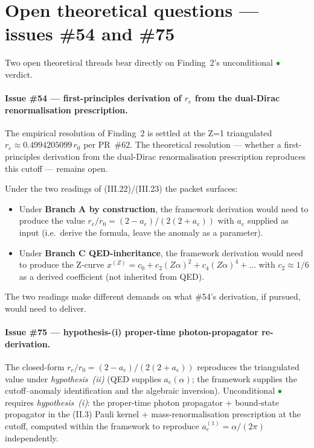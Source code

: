 \section{Open theoretical questions --- issues \#54 and \#75}
\label{sec:open-theoretical-question}

Two open theoretical threads bear directly on Finding~2's unconditional
$\mathbin{\hbox{\color{green!60!black}\(\bullet\)}}$ verdict.

\paragraph{Issue \#54 --- first-principles derivation of $r_e$ from the
dual-Dirac renormalisation prescription.}
The empirical resolution of Finding~2 is settled at the Z=1 triangulated
$r_e \approx 0.4994205099\,r_0$ per PR~\#62. The theoretical resolution ---
whether a first-principles derivation from the dual-Dirac renormalisation
prescription reproduces this cutoff --- remains open.

Under the two readings of (III.22)/(III.23) the packet surfaces:
\begin{itemize}[topsep=2pt,itemsep=0pt]
  \item Under \textbf{Branch A by construction}, the framework derivation
        would need to produce the value $r_e/r_0 = (2 - a_e)/(2(2 + a_e))$
        with $a_e$ supplied as input (i.e.~derive the formula, leave the
        anomaly as a parameter).
  \item Under \textbf{Branch C QED-inheritance}, the framework derivation
        would need to produce the Z-curve $x^{(Z)} = c_0 + c_2(Z\alpha)^2
        + c_4(Z\alpha)^4 + \dots$ with $c_2 \approx 1/6$ as a derived
        coefficient (not inherited from QED).
\end{itemize}
The two readings make different demands on what \#54's derivation, if
pursued, would need to deliver.

\paragraph{Issue \#75 --- hypothesis-(i) proper-time photon-propagator re-derivation.}
The closed-form $r_e/r_0 = (2 - a_e)/(2(2 + a_e))$ reproduces the
triangulated value under \emph{hypothesis~(ii)} (QED supplies $a_e(\alpha)$;
the framework supplies the cutoff--anomaly identification and the algebraic
inversion). Unconditional $\mathbin{\hbox{\color{green!60!black}\(\bullet\)}}$
requires \emph{hypothesis~(i)}: the proper-time photon propagator + bound-state
propagator in the (II.3) Pauli kernel + mass-renormalisation prescription at
the cutoff, computed within the framework to reproduce
$a_e^{(1)} = \alpha/(2\pi)$ independently.

